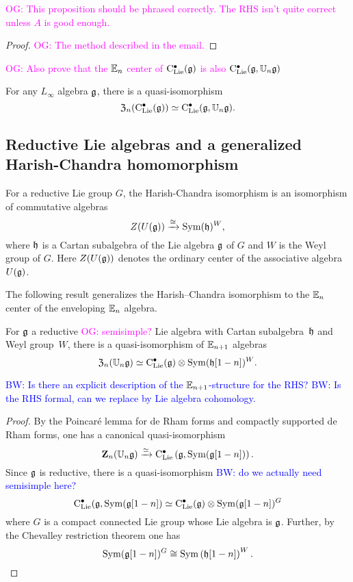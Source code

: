 \documentclass[11pt]{amsart}
\numberwithin{equation}{section}
\def\brian{\textcolor{blue}{BW: }\textcolor{blue}}
\def\owen{\textcolor{magenta}{OG: }\textcolor{magenta}}
\begin{document}
\owen{This proposition should be phrased correctly. The RHS isn't quite correct unless $A$ is good enough.}

\begin{proof}
\owen{The method described in the email.}
\end{proof}

\owen{Also prove that the $\mathbb E_n$ center of ${\rm C}_{\rm Lie}^\bullet(\mathfrak g)$ is also ${\rm C}_{\rm Lie}^\bullet(\mathfrak g, \mathbb U_n \mathfrak g)$}

\begin{cor}
\label{cor: koszul dual to main theorem}
For any $L_\infty$ algebra $\mathfrak g$,
there is a quasi-isomorphism
\[
{\frak Z}_n({\rm C}_{\rm Lie}^\bullet(\mathfrak g)) \simeq {\rm C}_{\rm Lie}^\bullet(\mathfrak g, \mathbb U_n \mathfrak g).
\]
\end{cor}

\subsection{Reductive Lie algebras and a generalized Harish-Chandra homomorphism}

For a reductive Lie group $G$, the Harish-Chandra isomorphism is an isomorphism of commutative algebras
\[
Z(U(\mathfrak g)) \xrightarrow{\cong} {\rm Sym} (\mathfrak h)^W,
\]
where $\mathfrak h$ is a Cartan subalgebra of the Lie algebra $\mathfrak g$ of $G$ and $W$ is the Weyl group of $G$. 
Here $Z(U(\mathfrak g))$ denotes the ordinary center of the associative algebra~$U(\mathfrak g)$. 

The following result generalizes the Harish--Chandra isomorphism to the $\mathbb E_n$ center of the  enveloping $\mathbb E_n$ algebra. 

\begin{prp}
For $\mathfrak g$ a reductive \owen{semisimple?} Lie algebra with Cartan subalgebra~$\mathfrak h$ and Weyl group~$W$, 
there is a quasi-isomorphism of $\mathbb E_{n+1}$ algebras
\[
{\frak Z}_n(\mathbb U_n \mathfrak g) \simeq {\rm C}_{\rm Lie}^\bullet (\mathfrak g) \otimes {\rm Sym}(\mathfrak h[1-n])^W.
\]
\end{prp}

\brian{Is there an explicit description of the $\mathbb E_{n+1}$-structure for the RHS?}
\brian{Is the RHS formal, can we replace by Lie algebra cohomology.}

\begin{proof}
By the Poincar\'{e} lemma for de Rham forms and compactly supported de Rham forms, one has a canonical quasi-isomorphism
\[
\mathbf Z_n(\mathbb U_n \mathfrak g) \xrightarrow{\simeq} {\rm C}_{\rm Lie}^\bullet\left(\mathfrak g, {\rm Sym}(\mathfrak g[1-n]) \right) .
\]
Since $\mathfrak g$ is reductive, there is a quasi-isomorphism \brian{do we actually need semisimple here?}
\[
{\rm C}_{\rm Lie}^\bullet(\mathfrak g, {\rm Sym}(\mathfrak g[1-n]) \simeq {\rm C}_{\rm Lie}^\bullet (\mathfrak g) \otimes {\rm Sym}(\mathfrak g[1-n])^G 
\]
where $G$ is a compact connected Lie group whose Lie algebra is $\mathfrak g$. 
Further, by the Chevalley restriction theorem one has 
\[
{\rm Sym}(\mathfrak g[1-n])^G \cong {\rm Sym} \left(\mathfrak h[1-n]\right)^W .
\]
\end{proof}
\end{document}
